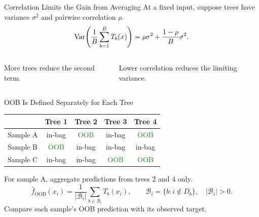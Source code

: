 \begin{frame}{Correlation Limits the Gain from Averaging}
  At a fixed input, suppose trees have variance $\sigma^2$ and pairwise correlation $\rho$.
  \pause
  \[\operatorname{Var}\!\left(\frac1B\sum_{b=1}^{B}T_b(x)\right)
      =\rho\sigma^2+\frac{1-\rho}{B}\sigma^2.\]
  \pause
  \begin{columns}[c,onlytextwidth]
    \centering
    More trees reduce the second term.\par\vspace{.35cm}
    Lower correlation reduces the limiting variance.
  \end{columns}
\end{frame}

\begin{frame}{OOB Is Defined Separately for Each Tree}
  \centering
  \renewcommand{\arraystretch}{1.15}
  \begin{tabular}{lcccc}
    \toprule
     & Tree 1 & Tree 2 & Tree 3 & Tree 4\\ \midrule
    Sample A & in-bag & \textcolor{forestgreen}{OOB} & in-bag & \textcolor{forestgreen}{OOB}\\
    Sample B & \textcolor{forestgreen}{OOB} & in-bag & in-bag & in-bag\\
    Sample C & in-bag & in-bag & \textcolor{forestgreen}{OOB} & \textcolor{forestgreen}{OOB}\\ \bottomrule
  \end{tabular}
  \pause
  \vspace{.25cm}
  \par For sample A, aggregate predictions from trees 2 and 4 only.
  \pause
  \vspace{.35cm}
  \[\widehat f_{\mathrm{OOB}}(x_i)
    =\frac{1}{|\mathcal B_i|}\sum_{b\in\mathcal B_i}T_b(x_i),
    \qquad\mathcal B_i=\{b:i\notin D_b\},\quad |\mathcal B_i|>0.\]
  \centering Compare each sample's OOB prediction with its observed target.
\end{frame}

